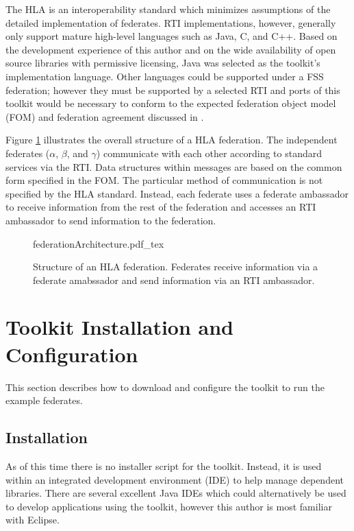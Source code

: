 \documentclass[]{article}
\begin{document}
The HLA is an interoperability standard which minimizes assumptions of the detailed implementation of federates. RTI implementations, however, generally only support mature high-level languages such as Java, C, and C++. Based on the development experience of this author and on the wide availability of open source libraries with permissive licensing, Java was selected as the toolkit's implementation language. Other languages could be supported under a FSS federation; however they must be supported by a selected RTI and ports of this toolkit would be necessary to conform to the expected federation object model (FOM) and federation agreement discussed in \textcite{grogan13}.

Figure \ref{fig:federationArchitecture} illustrates the overall structure of a HLA federation. The independent federates ($\alpha$, $\beta$, and $\gamma$) communicate with each other according to standard services via the RTI. Data structures within messages are based on the common form specified in the FOM. The particular method of communication is not specified by the HLA standard. Instead, each federate uses a federate ambassador to receive information from the rest of the federation and accesses an RTI ambassador to send information to the federation.

\begin{figure}
\centering
\small
{federationArchitecture.pdf_tex}
\caption{Structure of an HLA federation. Federates receive information via a federate amabssador and send information via an RTI ambassador.}
\label{fig:federationArchitecture}
\end{figure}

\section{Toolkit Installation and Configuration}

This section describes how to download and configure the toolkit to run the example federates. 
\subsection{Installation}

As of this time there is no installer script for the toolkit. Instead, it is used within an integrated development environment (IDE) to help manage dependent libraries. There are several excellent Java IDEs which could alternatively be used to develop applications using the toolkit, however this author is most familiar with Eclipse.
\end{document}
